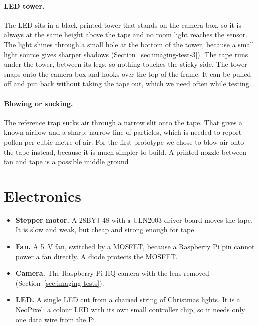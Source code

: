 \paragraph{LED tower.}
The LED sits in a black printed tower that stands on the camera box, so it is always at the same
height above the tape and no room light reaches the sensor. The light shines through a small
hole at the bottom of the tower, because a small light source gives sharper shadows
(Section~\ref{sec:imaging-test-3}). The tape runs under the tower, between its legs, so nothing
touches the sticky side. The tower snaps onto the camera box and hooks over the top of the frame.
It can be pulled off and put back without taking the tape out, which we need often while testing.

\paragraph{Blowing or sucking.}
The reference trap sucks air through a narrow slit onto the tape. That gives a known airflow
and a sharp, narrow line of particles, which is needed to report pollen per cubic metre of air.
For the first prototype we chose to blow air onto the tape instead, because it is much simpler
to build. A printed nozzle between fan and tape is a possible middle ground.

\section{Electronics}\label{sec:electronics}

\begin{itemize}
  \item \textbf{Stepper motor.} A 28BYJ-48 with a ULN2003 driver board moves the tape. It is
  slow and weak, but cheap and strong enough for tape.
  \item \textbf{Fan.} A 5~V fan, switched by a MOSFET, because a Raspberry Pi pin cannot power a
  fan directly. A diode protects the MOSFET.
  \item \textbf{Camera.} The Raspberry Pi HQ camera with the lens removed
  (Section~\ref{sec:imaging-tests}).
  \item \textbf{LED.} A single LED cut from a chained string of Christmas lights. It is a
  NeoPixel: a colour LED with its own small controller chip, so it needs only one data wire
  from the Pi.
\end{itemize}

